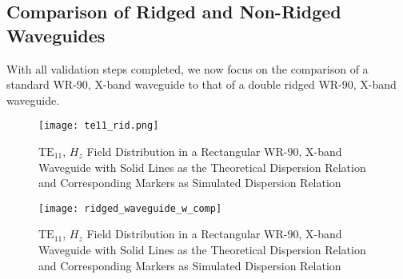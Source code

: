 \subsection{Comparison of Ridged and Non-Ridged Waveguides}
\label{subsec:rid_guides}
With all validation steps completed, we now focus on the comparison of a standard WR-90, X-band waveguide to that of a double ridged WR-90, X-band waveguide.

\begin{figure}[h!]  
	\centering
	\texttt{[image: te11\_rid.png]} 
	\caption{$\mathrm{TE_{11}}$, $H_z$ Field Distribution in a Rectangular WR-90, X-band Waveguide with Solid Lines as the Theoretical Dispersion Relation and Corresponding Markers as Simulated Dispersion Relation}
	\label{fig:rect_disp}
\end{figure}

\begin{figure}[h!]  
	\centering
	\texttt{[image: ridged\_waveguide\_w\_comp]} 
	\caption{$\mathrm{TE_{11}}$, $H_z$ Field Distribution in a Rectangular WR-90, X-band Waveguide with Solid Lines as the Theoretical Dispersion Relation and Corresponding Markers as Simulated Dispersion Relation}
	\label{fig:rect_disp}
\end{figure}
